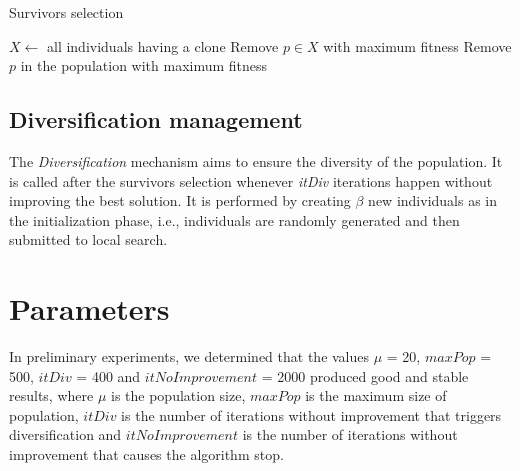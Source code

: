 \begin{algorithm}[H]
\caption{Survivors selection}
\label{survivors}
\begin{algorithmic}[1]
\STATE $X \leftarrow $ all individuals having a clone
\STATE Remove $p \in X$ with maximum fitness
\ELSE
\STATE Remove $p$ in the population with maximum fitness
\ENDIF
\ENDFOR
\end{algorithmic}
\end{algorithm}

\subsection{Diversification management}
The \textit{Diversification} mechanism aims to ensure the diversity of the population. It is called after the survivors selection whenever \textit{itDiv} iterations happen without improving the best solution. It is performed by creating $\beta$ new individuals as in the initialization phase, i.e., individuals are randomly generated and then submitted to local search.

\section{Parameters}
In preliminary experiments, we determined that the values $\mu$ = 20, $maxPop$ = 500, $itDiv$ = 400 and $itNoImprovement$ = 2000 produced good and stable results, where $\mu$ is the population size, $maxPop$ is the maximum size of population, $itDiv$ is the number of iterations without improvement that triggers diversification and $itNoImprovement$ is the number of iterations without improvement that causes the algorithm stop.